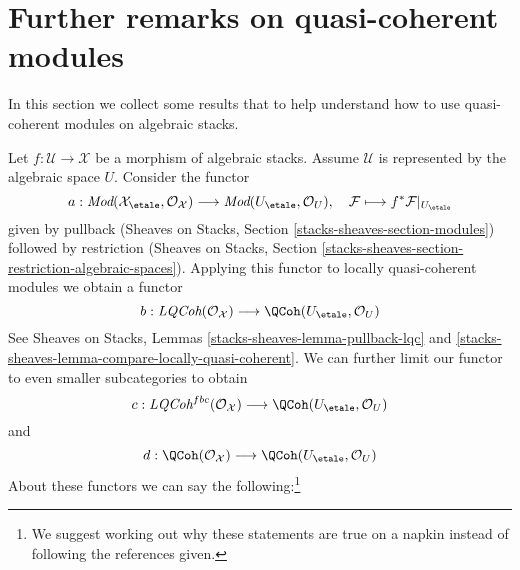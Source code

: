 \section{Further remarks on quasi-coherent modules}
\label{section-further-remarks}

\noindent
In this section we collect some results that to help understand how
to use quasi-coherent modules on algebraic stacks.

\medskip\noindent
Let $f : \mathcal{U} \to \mathcal{X}$ be a morphism of algebraic stacks.
Assume $\mathcal{U}$ is represented by the algebraic space $U$.
Consider the functor
$$
a :
\textit{Mod}(\mathcal{X}_\etale, \mathcal{O}_\mathcal{X})
\longrightarrow
\textit{Mod}(U_\etale, \mathcal{O}_U),\quad
\mathcal{F}
\longmapsto
f^*\mathcal{F}|_{U_\etale}
$$
given by pullback (Sheaves on Stacks, Section
\ref{stacks-sheaves-section-modules}) followed by restriction
(Sheaves on Stacks, Section
\ref{stacks-sheaves-section-restriction-algebraic-spaces}).
Applying this functor to locally quasi-coherent modules we obtain a functor
$$
b : \textit{LQCoh}(\mathcal{O}_\mathcal{X})
\longrightarrow
\QCoh(U_\etale, \mathcal{O}_U)
$$
See Sheaves on Stacks, Lemmas \ref{stacks-sheaves-lemma-pullback-lqc} and
\ref{stacks-sheaves-lemma-compare-locally-quasi-coherent}.
We can further limit our functor to even smaller subcategories to obtain
$$
c :
\textit{LQCoh}^{fbc}(\mathcal{O}_\mathcal{X})
\longrightarrow
\QCoh(U_\etale, \mathcal{O}_U)
$$
and
$$
d :
\QCoh(\mathcal{O}_\mathcal{X})
\longrightarrow
\QCoh(U_\etale, \mathcal{O}_U)
$$
About these functors we can say the following:\footnote{We suggest
working out why these statements are true on a napkin instead of
following the references given.}
